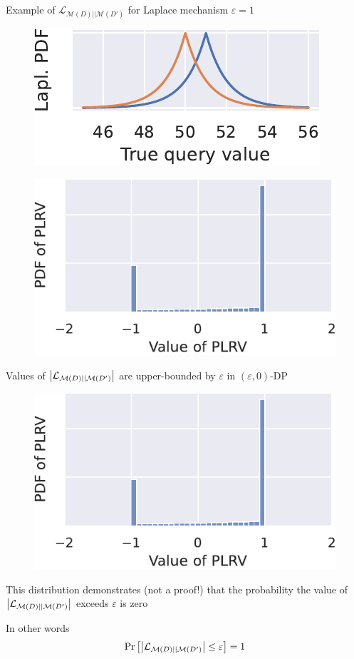\documentclass[12pt,aspectratio=169,handout]{beamer}
\begin{document}
\begin{frame}{Example of $\mathcal{L}_{\mathcal{M}(D) || \mathcal{M}(D')}$ for Laplace mechanism $\varepsilon = 1$}
\begin{figure}
\centering
\includegraphics[width=0.4\linewidth]{img/laplace-pdfs-01.pdf}
\end{figure}

\begin{figure}
\centering
\includegraphics[width=0.6\linewidth]{img/loss1.pdf}
\end{figure}

\end{frame}


\begin{frame}{Values of $\abs{\mathcal{L}_{\mathcal{M}(D) || \mathcal{M}(D')}}$ are upper-bounded by $\varepsilon$ in $(\varepsilon, 0)$-DP}
\begin{figure}
\centering
\includegraphics[width=0.5\linewidth]{img/loss1.pdf}
\end{figure}

This distribution demonstrates (not a proof!) that the probability the value of $\abs{\mathcal{L}_{\mathcal{M}(D) || \mathcal{M}(D')}}$ exceeds $\varepsilon$ is zero

In other words
$$
\Pr\left[\abs{\mathcal{L}_{\mathcal{M}(D) || \mathcal{M}(D')}} \leq \varepsilon \right]
= 1
$$

\end{frame}
\end{document}

